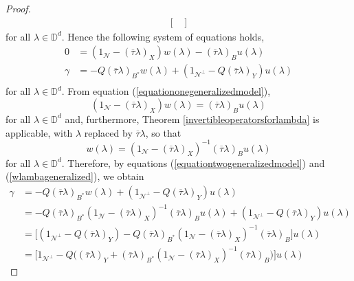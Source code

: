 \documentclass[11pt, reqno]{amsart}
\newcommand\1{\boldsymbol {1}}
\numberwithin{equation}{section}
\begin{document}
\begin{proof}
\begin{align*}
\begin{bmatrix}
    \end{bmatrix}
\end{align*}
for all $\lambda\in\mathbb{D}^{d}$. Hence the following system of equations holds,
\begin{align}
0 &= (1_{\mathcal{N}}-(\overline{\tau}\lambda)_{X})w(\lambda)-(\overline{\tau}\lambda)_{B}u(\lambda) \label{equationonegeneralizedmodel}\\
	\gamma &= -Q(\overline{\tau}\lambda)_{B^{*}}w(\lambda)+(1_{\mathcal{N}^{\perp}}-Q(\overline{\tau}\lambda)_{Y})u(\lambda)
        \label{equationtwogeneralizedmodel} \\ \nonumber
\end{align}
for all $\lambda\in\mathbb{D}^{d}$. From equation (\ref{equationonegeneralizedmodel}), 
\begin{equation}\label{importantequationlol}
(1_{\mathcal{N}}-(\overline{\tau}\lambda)_{X})w(\lambda) = (\overline{\tau}\lambda)_{B}u(\lambda)
\end{equation}
for all $\lambda\in\mathbb{D}^{d}$ and, furthermore, Theorem \ref{invertibleoperatorsforlambda} is applicable, with $\lambda$ replaced by $\overline{\tau}\lambda$, so that
\begin{equation}\label{wlambageneralized}
w(\lambda)=(1_{\mathcal{N}}-(\overline{\tau}\lambda)_{X})^{-1}(\overline{\tau}\lambda)_{B}u(\lambda)
\end{equation}
for all $\lambda\in\mathbb{D}^{d}$. Therefore, by equations (\ref{equationtwogeneralizedmodel}) and (\ref{wlambageneralized}), we obtain 
\begin{align}
\gamma  & = -Q(\overline{\tau}\lambda)_{B^{*}}w(\lambda)+(1_{\mathcal{N}^{\perp}}-Q(\overline{\tau}\lambda)_{Y})u(\lambda) \nonumber\\
        & = -Q(\overline{\tau}\lambda)_{B^{*}}(1_{\mathcal{N}}-(\overline{\tau}\lambda)_{X})^{-1}(\overline{\tau}\lambda)_{B}u(\lambda) + (1_{\mathcal{N}^{\perp}}-Q(\overline{\tau}\lambda)_{Y})u(\lambda)\nonumber\\
        & = \Big[ (1_{\mathcal{N}^{\perp}}-Q(\overline{\tau}\lambda)_{Y})-Q(\overline{\tau}\lambda)_{B^{*}}(1_{\mathcal{N}}-(\overline{\tau}\lambda)_{X})^{-1}(\overline{\tau}\lambda)_{B}\Big]u(\lambda)\nonumber\\ 
        & = \Big[ 1_{\mathcal{N}^{\perp}}-Q\Big((\overline{\tau}\lambda)_{Y}+(\overline{\tau}\lambda)_{B^{*}}(1_{\mathcal{N}}-(\overline{\tau}\lambda)_{X})^{-1}(\overline{\tau}\lambda)_{B}\Big)\Big]u(\lambda)
        \label{lastlineforgammageneralized}
\end{align}

\end{proof}
\end{document}
